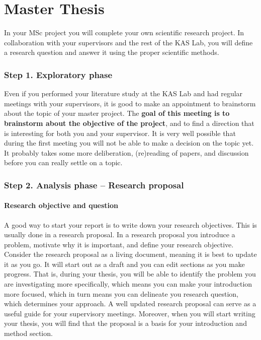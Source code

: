\chapter{Master Thesis}\label{c:msc_thesis}


In your MSc project you will complete your own scientific research project. In collaboration with your supervisors and the rest of the KAS Lab, you will define a research question and answer it using the proper scientific methods.


\subsection{Step 1. Exploratory phase}

Even if you performed your literature study at the KAS Lab and had regular meetings with your supervisors, it is good to make an appointment to brainstorm about the topic of your master project. The \textbf{goal of this meeting is to brainstorm about the objective of the project}, and to find a direction that is interesting for both you and your supervisor. It is very well possible that during the first meeting you will not be able to make a decision on the topic yet. It probably takes some more deliberation, (re)reading of papers, and discussion before you can really settle on a topic.

\subsection{Step 2. Analysis phase – Research proposal}

\subsubsection{Research objective and question}
A good way to start your report is to write down your research objectives. This is usually done in a research proposal. In a research proposal you introduce a problem, motivate why it is important, and define your research objective.
Consider the research proposal as a living document, meaning it is best to update it as you go. It will start out as a draft and you can edit sections as you make progress. That is, during your thesis, you will be able to identify the problem you are investigating more specifically, which means you can make your introduction more focused, which in turn means you can delineate you research question, which determines your approach. A well updated research proposal can serve as a useful guide for your supervisory meetings. Moreover, when you will start writing your thesis, you will find that the proposal is a basis for your introduction and method section.

